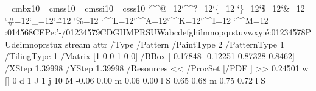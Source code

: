 \font\THFa=cmbx10
\font\THFb=cmss10
\font\THFd=cmssi10
\font\THFc=csss10
\begingroup
\catcode`\^^@=12\catcode`\^^?=12\catcode`\{=12
\catcode`\}=12\catcode`\$=12\catcode`\&=12
\catcode`\#=12\catcode`\_=12\catcode`\~=12
\catcode`\%=12
\catcode`\^^L=12\catcode`\^^A=12\catcode`\^^K=12\catcode`\^^I=12
\catcode`\^^M=12
\THFa:014568CEPe\endinclude{}\THFb:'-/01234579CDGHMPRSUWabcdefghilmnopqrstuvwxy\endinclude{}\THFc:^^e9\endinclude{}\THFd:01234578PUdeimnoprstux\endinclude\endgroup
\immediate\pdfobj stream attr {/Type /Pattern
/PaintType 2 /PatternType 1 /TilingType 1
/Matrix [1 0 0 1 0 0]
/BBox [-0.17848 -0.12251 0.87328 0.8462]
/XStep 1.39998
/YStep 1.39998
/Resources << /ProcSet [/PDF ] >>} {
0.24501 w
[] 0 d
1 J
1 j
10 M
-0.06 0.00 m
0.06 0.00 l
S
0.65 0.68 m
0.75 0.72 l
S
}\newcount\THPa\THPa=\pdflastobj

